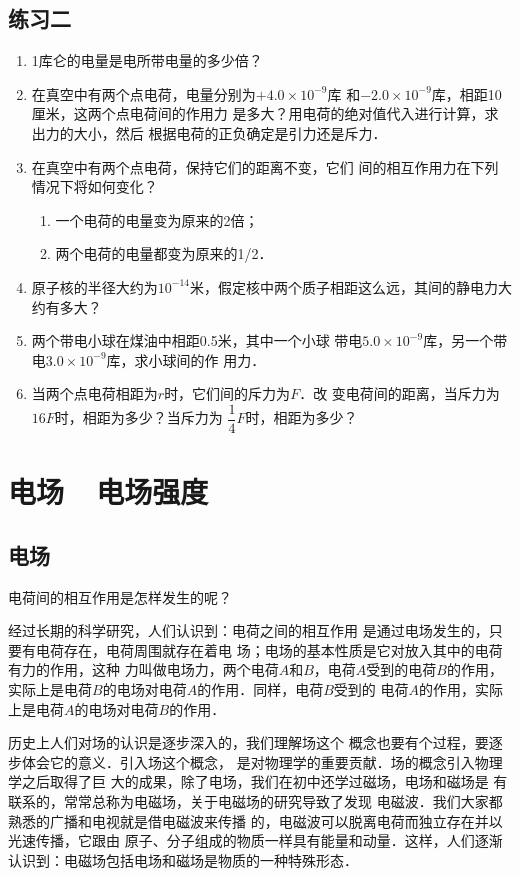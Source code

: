 \subsection*{练习二}

\begin{enumerate}
    \item 1库仑的电量是电所带电量的多少倍？
    \item 在真空中有两个点电荷，电量分别为$+4.0\times10^{-9}$库
和$-2.0\times10^{-9}$库，相距10厘米，这两个点电荷间的作用力
是多大？用电荷的绝对值代入进行计算，求出力的大小，然后
根据电荷的正负确定是引力还是斥力．
\item 在真空中有两个点电荷，保持它们的距离不变，它们
间的相互作用力在下列情况下将如何变化？
\begin{enumerate}
    \item 一个电荷的电量变为原来的2倍；
    \item 两个电荷的电量都变为原来的1/2．
\end{enumerate}
\item 原子核的半径大约为$10^{-14}$米，假定核中两个质子相距这么远，其间的静电力大约有多大？
\item 两个带电小球在煤油中相距0.5米，其中一个小球
带电$5.0\times10^{-9}$库，另一个带电$3.0\times10^{-9}$库，求小球间的作
用力．
\item 当两个点电荷相距为$r$时，它们间的斥力为$F$．改
变电荷间的距离，当斥力为$16F$时，相距为多少？当斥力为
$\dfrac{1}{4}F$时，相距为多少？
\end{enumerate}


\section{电场~~电场强度}

\subsection{电场}
电荷间的相互作用是怎样发生的呢？

经过长期的科学研究，人们认识到：电荷之间的相互作用
是通过电场发生的，只要有电荷存在，电荷周围就存在着电
场；电场的基本性质是它对放入其中的电荷有力的作用，这种
力叫做电场力，两个电荷$A$和$B$，电荷$A$受到的电荷$B$的作用，
实际上是电荷$B$的电场对电荷$A$的作用．同样，电荷$B$受到的
电荷$A$的作用，实际上是电荷$A$的电场对电荷$B$的作用．

历史上人们对场的认识是逐步深入的，我们理解场这个
概念也要有个过程，要逐步体会它的意义．引入场这个概念，
是对物理学的重要贡献．场的概念引入物理学之后取得了巨
大的成果，除了电场，我们在初中还学过磁场，电场和磁场是
有联系的，常常总称为电磁场，关于电磁场的研究导致了发现
电磁波．我们大家都熟悉的广播和电视就是借电磁波来传播
的，电磁波可以脱离电荷而独立存在并以光速传播，它跟由
原子、分子组成的物质一样具有能量和动量．这样，人们逐渐
认识到：电磁场包括电场和磁场是物质的一种特殊形态．


